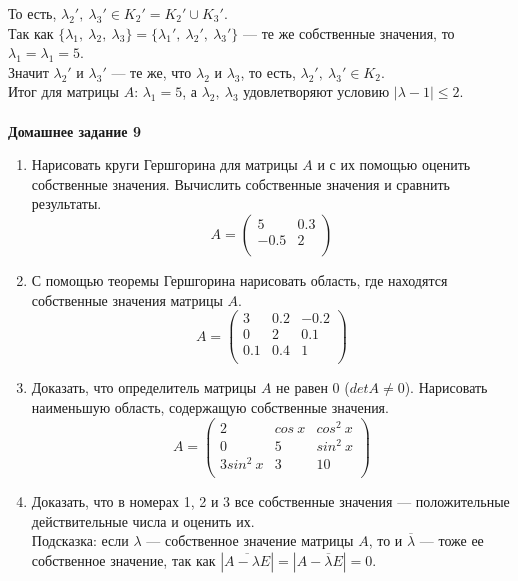 \documentclass[12pt]{article}
\theoremstyle{definition}
\numberwithin{equation}{section}
\begin{document}
То есть, $\lambda_2',~\lambda_3'\in K_2'=K_2'\cup K_3'$.\\
Так как $\{\lambda_1,~\lambda_2,~\lambda_3\}=\{\lambda_1',~\lambda_2',~\lambda_3'\}$ --- те же собственные значения, то $\lambda_1=\lambda_1=5$.\\
Значит $\lambda_2'$ и $\lambda_3'$ --- те же, что $\lambda_2$ и $\lambda_3$, то есть, $\lambda_2',~\lambda_3'\in K_2$.\\
Итог для матрицы $A$: $\lambda_1=5$, а $\lambda_2,~\lambda_3$ удовлетворяют условию $|\lambda-1|\leqslant 2$.\\ \\
\textbf{Домашнее задание 9}\begin{enumerate}
\item Нарисовать круги Гершгорина для матрицы $A$ и с их помощью оценить собственные значения. Вычислить собственные значения и сравнить результаты.
\[A = \begin{pmatrix}
5 & 0.3\\
-0.5 & 2\\
\end{pmatrix}\]
\item С помощью теоремы Гершгорина нарисовать область, где находятся собственные значения матрицы $A$.
\[A = \begin{pmatrix}
3 & 0.2 & -0.2\\
0 & 2 & 0.1\\
0.1 & 0.4 & 1\\
\end{pmatrix}\]
\item Доказать, что определитель матрицы $A$ не равен 0 ($detA\neq 0$). Нарисовать наименьшую область, содержащую собственные значения.
\[A = \begin{pmatrix}
2 & cos~x & cos^2~x\\
0 & 5 & sin^2~x\\
3sin^2~x & 3 & 10\\
\end{pmatrix}\]
\item Доказать, что в номерах 1, 2 и 3 все собственные значения --- положительные действительные числа и оценить их.\\
Подсказка: если $\lambda$ --- собственное значение матрицы $A$, то и $\overline \lambda$ --- тоже ее собственное значение, так как $|\overline{A-\lambda E}|=|A-\overline\lambda E|=0$.
\end{enumerate}
~\\
\end{document}
